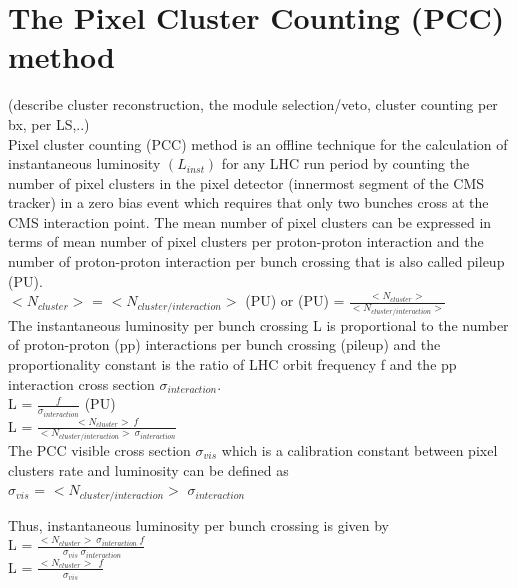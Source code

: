 \section{The Pixel Cluster Counting (PCC) method}
\label{sec:pcc}
(describe cluster reconstruction, the module selection/veto, cluster counting per bx, per LS,..) \\

Pixel cluster counting (PCC)  method is an offline technique for the calculation of instantaneous luminosity $(L_{inst})$ for any LHC run period by counting the number of pixel clusters in the pixel detector (innermost segment of the CMS tracker) in a zero bias event which requires that only two bunches cross at the CMS interaction point. The mean number of pixel clusters can be expressed in terms of mean number of pixel clusters per proton-proton interaction and the number of proton-proton interaction per bunch crossing that is also called pileup (PU). \\

$<N_{cluster}>$ = $<N_{cluster/interaction}>$ (PU)  or (PU) = $\frac{<N_{cluster}>}{<N_{cluster/interaction}>}$ \\

The instantaneous luminosity per bunch crossing L is proportional to the number of proton-proton (pp) interactions per bunch crossing (pileup) and the proportionality constant is the ratio of  LHC orbit frequency f and the pp interaction cross section $\sigma_{interaction}$. \\

L = $\frac{f}{\sigma_{interaction}}$ (PU)  \\

L = $\frac{<N_{cluster}> \: f }{<N_{cluster/interaction}> \: \sigma_{interaction}}$ \\

The PCC visible cross section $\sigma_{vis}$ which is a calibration constant between pixel clusters rate and luminosity can be defined as \\

$\sigma_{vis}$ = $<N_{cluster/interaction}>$  $\sigma_{interaction}$

Thus, instantaneous luminosity per bunch crossing is given by \\

L = $\frac{<N_{cluster}> \: \sigma_{interaction} \: f }{ \:\sigma_{vis} \: \sigma_{interaction}}$ \\

L = $\frac{<N_{cluster}> \:\: f}{\sigma_{vis}}$ \\

